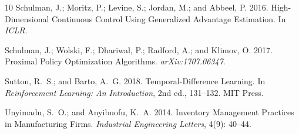 \documentclass[letterpaper]{article} %
\begin{document}
\begin{thebibliography}{10}
Schulman, J.; Moritz, P.; Levine, S.; Jordan, M.; and Abbeel, P.
2016.
\newblock High-Dimensional Continuous Control Using Generalized
Advantage Estimation.
\newblock In \emph{ICLR}.

Schulman, J.; Wolski, F.; Dhariwal, P.; Radford, A.; and
Klimov, O. 2017.
\newblock Proximal Policy Optimization Algorithms.
\newblock \emph{arXiv:1707.06347}.

Sutton, R.~S.; and Barto, A.~G. 2018.
\newblock Temporal-Difference Learning.
\newblock In \emph{Reinforcement Learning: An Introduction}, 2nd
ed., 131--132. MIT Press.

Unyimadu, S.~O.; and Anyibuofu, K.~A. 2014.
\newblock Inventory Management Practices in Manufacturing Firms.
\newblock \emph{Industrial Engineering Letters}, 4(9): 40--44.

\end{thebibliography}
\end{document}
